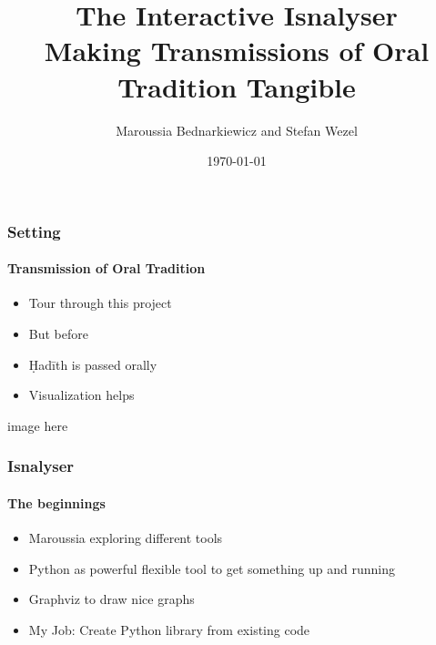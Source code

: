 \documentclass[9pt]{beamer}
\title{The Interactive Isnalyser \\
	\small Making Transmissions of Oral Tradition Tangible}
\author{Maroussia Bednarkiewicz and Stefan Wezel}
\institute{mlcolab @ Tübingen University Cluster of Excellence}
\date{\today}
\begin{document}
	

\begin{frame}[plain]
	\titlepage
\end{frame} 



\begin{frame}
\frametitle{Setting}
\framesubtitle{Transmission of Oral Tradition}
\begin{itemize}%
	\item Tour through this project
	\item But before
	\item Ḥadīth is passed orally
	\item Visualization helps
\end{itemize}
image here
\end{frame} 



\begin{frame}
\frametitle{Isnalyser}
\framesubtitle{The beginnings}
\begin{itemize}%
	\item Maroussia exploring different tools
	\item Python as powerful flexible tool to get something up and running
	\item Graphviz to draw nice graphs
	\item My Job: Create Python library from existing code
\end{itemize}
\end{frame} 
\end{document}
